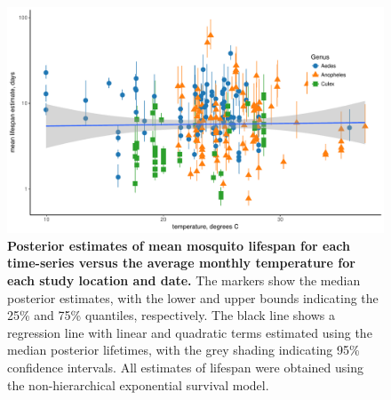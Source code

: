 \documentclass[12pt]{article}
\begin{document}
\begin{figure}[h]
	\centerline{\includegraphics[width=1\textwidth]{./Figure_files/mrr_lifeSpanVsTemperature.pdf}}
	\caption{\textbf{Posterior estimates of mean mosquito lifespan for each time-series versus the average monthly temperature for each study location and date.} The markers show the median posterior estimates, with the lower and upper bounds indicating the 25\% and 75\% quantiles, respectively. The black line shows a regression line with linear and quadratic terms estimated using the median posterior lifetimes, with the grey shading indicating 95\% confidence intervals. All estimates of lifespan were obtained using the non-hierarchical exponential survival model.}\label{fig:mrr_temperature}
\end{figure}
\end{document}
